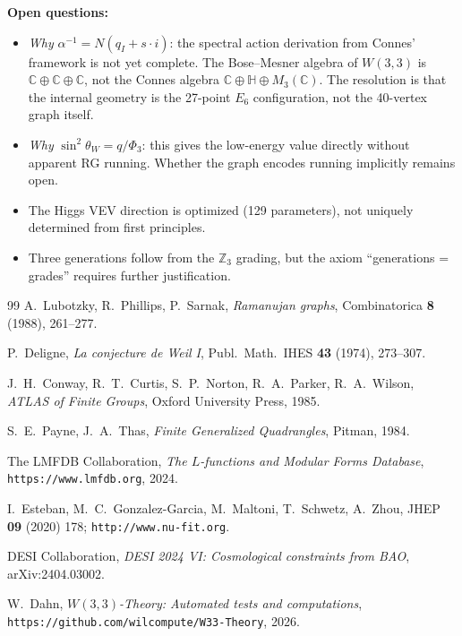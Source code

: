 \documentclass[12pt]{article}
\begin{document}
\noindent\textbf{Open questions:}
\begin{itemize}
\item \emph{Why} $\alpha^{-1} = N(q_I + s\cdot i)$: the spectral action
  derivation from Connes' framework is not yet complete. The Bose--Mesner
  algebra of $W(3,3)$ is $\mathbb{C} \oplus \mathbb{C} \oplus \mathbb{C}$,
  not the Connes algebra $\mathbb{C} \oplus \mathbb{H} \oplus M_3(\mathbb{C})$.
  The resolution is that the internal geometry is the 27-point $E_6$ configuration,
  not the 40-vertex graph itself.
\item \emph{Why} $\sin^2\theta_W = q/\Phi_3$: this gives the low-energy value directly
  without apparent RG running. Whether the graph encodes running implicitly remains open.
\item The Higgs VEV direction is optimized (129 parameters), not uniquely determined
  from first principles.
\item Three generations follow from the $\mathbb{Z}_3$ grading, but the axiom
  ``generations = grades'' requires further justification.
\end{itemize}

\begin{thebibliography}{99}
  A.~Lubotzky, R.~Phillips, P.~Sarnak,
  \emph{Ramanujan graphs},
  Combinatorica \textbf{8} (1988), 261--277.

  P.~Deligne,
  \emph{La conjecture de Weil I},
  Publ.\ Math.\ IHES \textbf{43} (1974), 273--307.

  J.~H.~Conway, R.~T.~Curtis, S.~P.~Norton, R.~A.~Parker, R.~A.~Wilson,
  \emph{ATLAS of Finite Groups},
  Oxford University Press, 1985.

  S.~E.~Payne, J.~A.~Thas,
  \emph{Finite Generalized Quadrangles},
  Pitman, 1984.

  The LMFDB Collaboration,
  \emph{The $L$-functions and Modular Forms Database},
  \texttt{https://www.lmfdb.org}, 2024.

  I.~Esteban, M.~C.~Gonzalez-Garcia, M.~Maltoni, T.~Schwetz, A.~Zhou,
  JHEP \textbf{09} (2020) 178; \texttt{http://www.nu-fit.org}.

  DESI Collaboration,
  \emph{DESI 2024 VI: Cosmological constraints from BAO},
  arXiv:2404.03002.

  W.~Dahn,
  \emph{$W(3,3)$-Theory: Automated tests and computations},
  \texttt{https://github.com/wilcompute/W33-Theory}, 2026.
\end{thebibliography}
\end{document}
